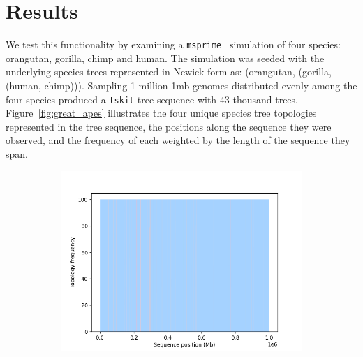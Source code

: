 \documentclass{article}
\newcommand{\tskit}{{\texttt{tskit}}}
\newcommand{\msprime}{{\texttt{msprime}}}
\begin{document}
\section{Results}
We test this functionality by examining a \msprime{}~\citep{msprime} simulation of four species:
orangutan, gorilla, chimp and human. The simulation was seeded with the underlying
species trees represented in Newick form as: (orangutan, (gorilla, (human, chimp))).
Sampling 1 million 1mb genomes distributed evenly among the four species
produced a \tskit{} tree sequence with 43 thousand trees.
Figure~\ref{fig:great_apes} illustrates the four unique
species tree topologies represented in the tree sequence, the positions
along the sequence they were observed, and the frequency of each weighted by
the length of the sequence they span.

\begin{figure}[H]
    \centering
    \begin{minipage}{.9\textwidth}
        \begin{subfigure}{\linewidth}
            \centering
            \includegraphics[scale=0.48]{great_apes_area_plot.png}
        \end{subfigure}
    \end{minipage}
    \begin{minipage}{.9\textwidth}
        \centering
        \fontsize{2}{5}\selectfont
        \begin{minipage}{.24\textwidth}

\end{minipage}
\end{minipage}
\end{figure}
\end{document}
